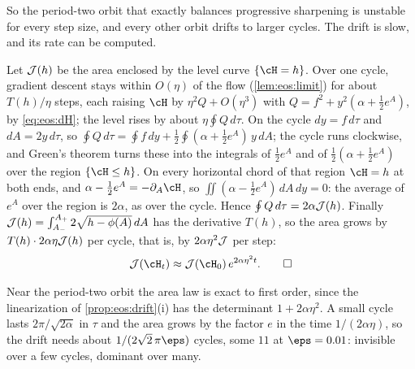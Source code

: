 \begin{refsection}
So the period-two orbit that exactly balances progressive sharpening is unstable for every step size, and every other orbit drifts to larger cycles. The drift is slow, and its rate can be computed.

\begin{heuristic}
Let $\mathcal{J}(h)$ be the area enclosed by the level curve $\{\cH=h\}$. Over one cycle, gradient descent stays within $O(\eta)$ of the flow (\cref{lem:eos:limit}) for about $T(h)/\eta$ steps, each raising $\cH$ by $\eta^2Q+O(\eta^3)$ with $Q=f^2+y^2(\alpha+\frac12e^A)$, by \eqref{eq:eos:dH}; the level rises by about $\eta\oint Q\,d\tau$. On the cycle $dy=f\,d\tau$ and $dA=2y\,d\tau$, so $\oint Q\,d\tau=\oint f\,dy+\frac12\oint(\alpha+\frac12e^A)\,y\,dA$; the cycle runs clockwise, and Green's theorem turns these into the integrals of $\frac12e^A$ and of $\frac12(\alpha+\frac12e^A)$ over the region $\{\cH\le h\}$. On every horizontal chord of that region $\cH=h$ at both ends, and $\alpha-\frac12e^A=-\partial_A\cH$, so $\iint(\alpha-\frac12e^A)\,dA\,dy=0$: the average of $e^A$ over the region is $2\alpha$, as over the cycle. Hence $\oint Q\,d\tau=2\alpha\mathcal{J}(h)$. Finally $\mathcal{J}(h)=\int_{A_-}^{A_+}2\sqrt{h-\phi(A)}\,dA$ has the derivative $T(h)$, so the area grows by $T(h)\cdot2\alpha\eta\mathcal{J}(h)$ per cycle, that is, by $2\alpha\eta^2\mathcal{J}$ per step:
\begin{equation}\label{eq:eos:area}
  \eosArea(\cH_t)\approx\eosArea(\cH_0)\,e^{2\alpha\eta^2t}.\qedhere
\end{equation}
\end{heuristic}

Near the period-two orbit the area law is exact to first order, since the linearization of \cref{prop:eos:drift}(i) has the determinant $1+2\alpha\eta^2$. A small cycle lasts $2\pi/\sqrt{2\alpha}$ in $\tau$ and the area grows by the factor $e$ in the time $1/(2\alpha\eta)$, so the drift needs about $1/(2\sqrt2\,\pi\eps)$ cycles, some $11$ at $\eps=0.01$: invisible over a few cycles, dominant over many.


\end{refsection}

